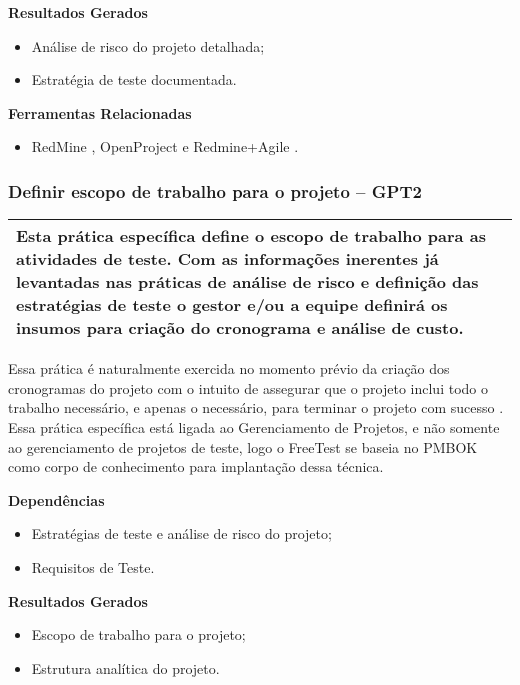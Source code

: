 \textbf{Resultados Gerados}
\begin{itemize}
    \item Análise de risco do projeto detalhada;
    \item Estratégia de teste documentada.
\end{itemize}

\textbf{Ferramentas Relacionadas}
\begin{itemize}
    \item RedMine \cite{Redmine}, OpenProject \cite{OpenProject} e Redmine+Agile \cite{RedmineUP}.
\end{itemize}


\subsubsection{Definir escopo de trabalho para o projeto – GPT2}
\label{sec:gpt2}

\begin{table}[H]
\centering
\begin{tabular}{|p{130mm}|}
\hline
Esta prática específica define o escopo de trabalho para as atividades de teste. Com as informações inerentes já levantadas nas práticas de análise de risco e definição das estratégias de teste o gestor e/ou a equipe definirá os insumos para criação do cronograma e análise de custo. \\ 
\hline
\end{tabular}
\end{table}

Essa prática é naturalmente exercida no momento prévio da criação dos cronogramas do projeto com o intuito de assegurar que o projeto inclui todo o trabalho necessário, e apenas o necessário, para terminar o projeto com sucesso \cite{pmbok2014}. Essa prática específica está ligada ao Gerenciamento de Projetos, e não somente ao gerenciamento de projetos de teste, logo o FreeTest se baseia no PMBOK como corpo de conhecimento para implantação dessa técnica.

\textbf{Dependências}
\begin{itemize}
    \item Estratégias de teste e análise de risco do projeto;
    \item Requisitos de Teste.
\end{itemize}

\textbf{Resultados Gerados}
\begin{itemize}
    \item Escopo de trabalho para o projeto;
    \item Estrutura analítica do projeto.
\end{itemize}

